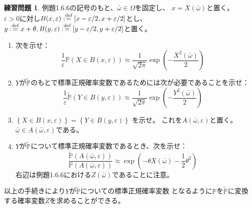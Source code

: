 \documentclass[uplatex]{jsarticle}
\theoremstyle{definition}
\newtheorem{prob}[prob]{練習問題}
\def\ep{\varepsilon}
\def\P{\mathbb{P}}
\def\dfn{:\overset{\mbox{{\scriptsize def}}}{=}}
\begin{document}
\begin{prob}\label{prob: 1.13}
  例題1.6.6の記号のもと、\(\bar{\omega}\in \Omega\)を固定し、
  \(x=X(\bar{\omega})\)と置く。
  \(\ep > 0\)に対し\(B(x,\ep) \dfn [x-\ep/2, x+\ep/2]\)とし、
  \(y\dfn x+\theta, B(y,\ep) \dfn [y-\ep/2, y+\ep/2]\)と置く。
  \begin{enumerate}
    \item \label{enumi: 1.13-1}
    次を示せ：
    \[
    \frac{1}{\ep}\P(X\in B(x,\ep)) \approx
    \frac{1}{\sqrt{2\pi}}\exp(-\frac{X^2(\bar{\omega})}{2})
    \]
    \item \label{enumi: 1.13-2}
    \(Y\)が\(\tilde{\P}\)のもとで標準正規確率変数であるためには次が必要であることを示せ：
    \[
    \frac{1}{\ep}\tilde{\P}(Y\in B(y,\ep)) \approx
    \frac{1}{\sqrt{2\pi}}\exp(-\frac{Y^2(\bar{\omega})}{2})
    \]
    \item \label{enumi: 1.13-3}
    \(\left\{ X\in B(x,\ep)\right\} = \left\{ Y\in B(y,\ep)\right\}\)
    を示せ。
    これを\(A(\bar{\omega},\ep)\)と置く。
    \(\bar{\omega}\in A(\bar{\omega},\ep)\)である。
    \item \label{enumi: 1.13-4}
    \(Y\)が\(\tilde{\P}\)について標準正規確率変数であるとき、次を示せ：
    \[
    \frac{\tilde{\P}(A(\bar{\omega},\ep))}{\P(A(\bar{\omega},\ep))}
    \approx \exp(-\theta X(\bar{\omega})-\frac{1}{2}\theta^2)
    \]
    右辺は例題1.6.6における\(Z(\bar{\omega})\)であることに注意。
  \end{enumerate}
  以上の手続きにより\(Y\)が\(\tilde{\P}\)についての標準正規確率変数
  となるように\(\P\)を\(\tilde{\P}\)に変換する確率変数\(Z\)を求めることができる。
\end{prob}
\end{document}
